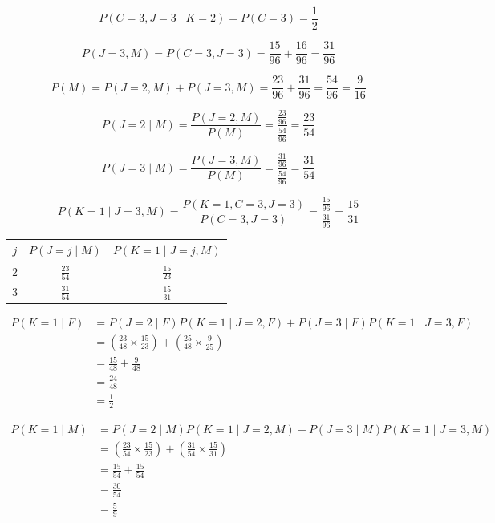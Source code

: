 \documentclass[11pt,a4paper]{article}
\begin{document}
\begin{enumerate}
    $$
    P(C=3, J=3 \mid K=2) = P(C=3) = \frac{1}{2}
    $$

    $$
    P(J=3, M) = P(C=3, J=3) = \frac{15}{96} + \frac{16}{96} = \frac{31}{96}
    $$

    $$
    P(M) = P(J=2, M) + P(J=3, M) = \frac{23}{96} + \frac{31}{96} = \frac{54}{96} = \frac{9}{16}
    $$

    $$
    P(J=2 \mid M) = \frac{P(J=2, M)}{P(M)} = \frac{\frac{23}{96}}{\frac{54}{96}} = \frac{23}{54}
    $$

    $$
    P(J=3 \mid M) = \frac{P(J=3, M)}{P(M)} = \frac{\frac{31}{96}}{\frac{54}{96}} = \frac{31}{54}
    $$

    $$
    P(K=1 \mid J=3, M) = \frac{P(K=1, C=3, J=3)}{P(C=3, J=3)} = \frac{\frac{15}{96}}{\frac{31}{96}} = \frac{15}{31}
    $$

    \begin{center}
    \begin{tabular}{ccc}
    \toprule $j$ & $P(J=j \mid M)$ & $P(K=1 \mid J=j, M)$ \\\midrule
    $2$ & $\frac{23}{54}$ & $\frac{15}{23}$ \\
    $3$ & $\frac{31}{54}$ & $\frac{15}{31}$ \\\bottomrule
    \end{tabular}
    \end{center} 

    $$
    \begin{aligned}
    P(K=1 \mid F)
    &= P(J=2 \mid F) P(K=1 \mid J=2, F) + P(J=3 \mid F) P(K=1 \mid J=3, F) \\
    &= \left(\frac{23}{48} \times \frac{15}{23}\right) + \left(\frac{25}{48} \times \frac{9}{25}\right) \\
    &= \frac{15}{48} + \frac{9}{48} \\
    &= \frac{24}{48} \\
    &= \frac{1}{2}
    \end{aligned}
    $$

    $$
    \begin{aligned}
    P(K=1 \mid M)
    &= P(J=2 \mid M) P(K=1 \mid J=2, M) + P(J=3 \mid M) P(K=1 \mid J=3, M) \\
    &= \left(\frac{23}{54} \times \frac{15}{23}\right) + \left(\frac{31}{54} \times \frac{15}{31}\right) \\
    &= \frac{15}{54} + \frac{15}{54} \\
    &= \frac{30}{54} \\
    &= \frac{5}{9}
    \end{aligned}
    $$


\end{enumerate}
\end{document}
